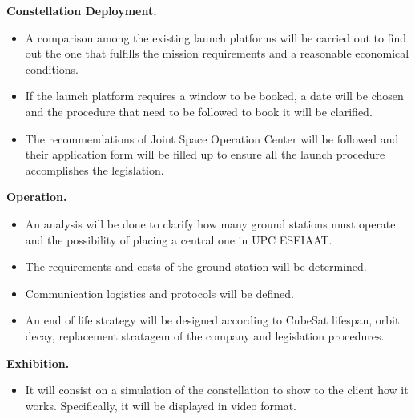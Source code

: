 {\bfseries Constellation Deployment.} 

\begin{itemize}
	\item A comparison among the existing launch platforms will be carried out to find out the one that fulfills the mission requirements and a reasonable economical conditions.
	\item If the launch platform requires a window to be booked, a date will be chosen and the procedure that need to be followed to book it will be clarified.
	\item The recommendations of Joint Space Operation Center will be followed and their application form will be filled up to ensure all the launch procedure accomplishes the legislation. 
\end{itemize}

{\bfseries Operation.} 

\begin{itemize}
	\item An analysis will be done to clarify how many ground stations must operate and the possibility of placing a central one in UPC ESEIAAT.
	\item The requirements and costs of the ground station will be determined. 
	\item Communication logistics and protocols will be defined.
	\item An end of life strategy will be designed according to CubeSat lifespan, orbit decay, replacement stratagem of the company and legislation procedures. 
\end{itemize}

{\bfseries Exhibition.}

\begin{itemize}
	\item It will consist on a simulation of the constellation to show to the client how it works. Specifically, it will be displayed in video format.

\end{itemize}